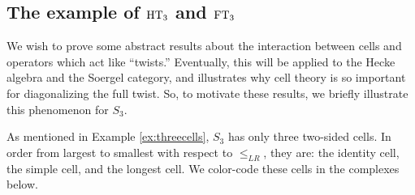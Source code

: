 

\subsection{The example of $\operatorname{HT}_3$ and $\operatorname{FT}_3$}
\label{subsec:HT3}

We wish to prove some abstract results about the interaction between cells and operators which act like ``twists.'' Eventually, this will be applied to the Hecke algebra and the Soergel
category, and illustrates why cell theory is so important for diagonalizing the full twist. So, to motivate these results, we briefly illustrate this phenomenon for $S_3$.

As mentioned in Example \ref{ex:threecells}, $S_3$ has only three two-sided cells. In order from largest to smallest with respect to $\le_{LR}$, they are: the {\color{brown} identity cell}, the {\color{red} simple cell}, and the {\color{blue} longest cell}. We color-code these cells in the complexes below.


